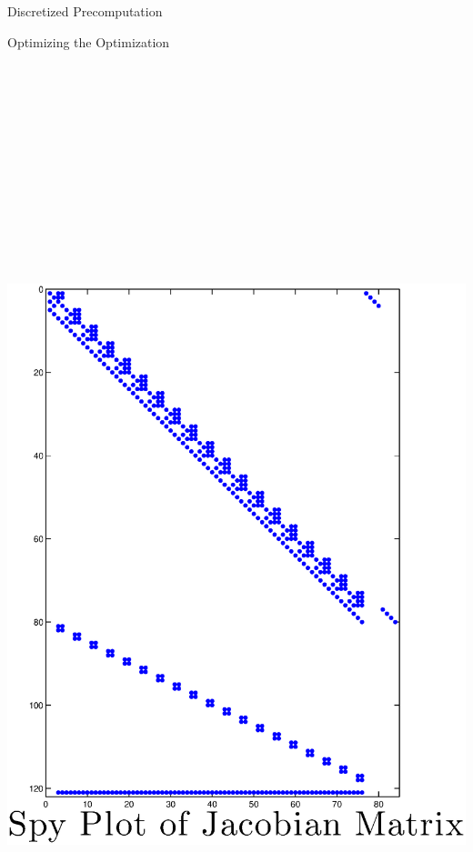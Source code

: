 \documentclass[final]{beamer}
\begin{document}
\begin{frame}{}
{\begin{columns}[t]
\begin{column}{.30\linewidth}
\begin{block}{\centering Discretized Precomputation}


\end{block}
             

\begin{block}{\centering Optimizing the Optimization}



\centering\includegraphics[height=30cm, width=30cm]{figures/Better6_Spy_Jacobian.eps} 

\end{block}
\end{column}
\end{columns}}
\end{frame}
\end{document}
